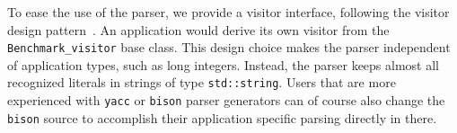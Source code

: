 To ease the use of the parser, we provide a visitor interface,
following the visitor design pattern~\cite{cgal:ghjv-dpero-95}.  An
application would derive its own visitor from the
\texttt{Benchmark\_visitor} base class. This design choice makes the
parser independent of application types, such as long integers.
Instead, the parser keeps almost all recognized literals in strings of
type \texttt{std::string}. Users that are more experienced with
\texttt{yacc} or \texttt{bison} parser generators can of course also
change the \texttt{bison} source to accomplish their application
specific parsing directly in there.

